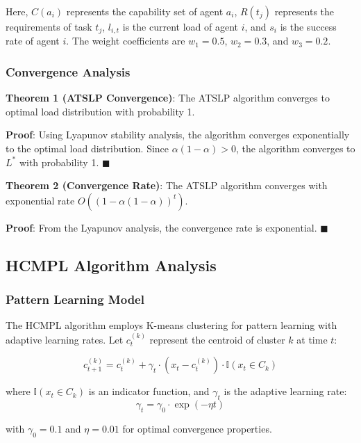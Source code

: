 \documentclass[conference]{IEEEtran}
\begin{document}
Here, $C(a_i)$ represents the capability set of agent $a_i$, $R(t_j)$ represents the requirements of task $t_j$, $l_{i,t}$ is the current load of agent $i$, and $s_i$ is the success rate of agent $i$. The weight coefficients are $w_1 = 0.5$, $w_2 = 0.3$, and $w_3 = 0.2$.

\subsubsection{Convergence Analysis}

\textbf{Theorem 1 (ATSLP Convergence)}: The ATSLP algorithm converges to optimal load distribution with probability 1.

\textbf{Proof}: Using Lyapunov stability analysis, the algorithm converges exponentially to the optimal load distribution. Since $\alpha(1-\alpha) > 0$, the algorithm converges to $L^*$ with probability 1. $\blacksquare$

\textbf{Theorem 2 (Convergence Rate)}: The ATSLP algorithm converges with exponential rate $O((1-\alpha(1-\alpha))^t)$.

\textbf{Proof}: From the Lyapunov analysis, the convergence rate is exponential. $\blacksquare$

\subsection{HCMPL Algorithm Analysis}

\subsubsection{Pattern Learning Model}

The HCMPL algorithm employs K-means clustering for pattern learning with adaptive learning rates. Let $c_t^{(k)}$ represent the centroid of cluster $k$ at time $t$:

\begin{equation}
c_{t+1}^{(k)} = c_t^{(k)} + \gamma_t \cdot (x_t - c_t^{(k)}) \cdot \mathbb{I}(x_t \in C_k)
\end{equation}

where $\mathbb{I}(x_t \in C_k)$ is an indicator function, and $\gamma_t$ is the adaptive learning rate:
\begin{equation}
\gamma_t = \gamma_0 \cdot \exp(-\eta t)
\end{equation}

with $\gamma_0 = 0.1$ and $\eta = 0.01$ for optimal convergence properties.
\end{document}

